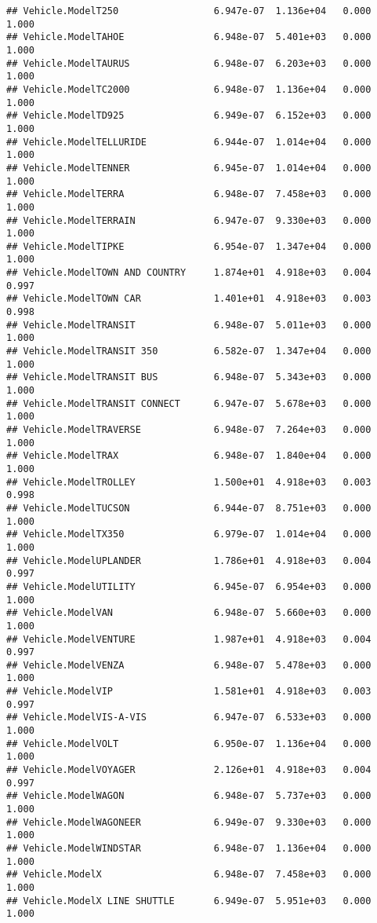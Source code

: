 \documentclass[
]{article}
\begin{document}
\begin{verbatim}
## Vehicle.ModelT250                 6.947e-07  1.136e+04   0.000    1.000
## Vehicle.ModelTAHOE                6.948e-07  5.401e+03   0.000    1.000
## Vehicle.ModelTAURUS               6.948e-07  6.203e+03   0.000    1.000
## Vehicle.ModelTC2000               6.948e-07  1.136e+04   0.000    1.000
## Vehicle.ModelTD925                6.949e-07  6.152e+03   0.000    1.000
## Vehicle.ModelTELLURIDE            6.944e-07  1.014e+04   0.000    1.000
## Vehicle.ModelTENNER               6.945e-07  1.014e+04   0.000    1.000
## Vehicle.ModelTERRA                6.948e-07  7.458e+03   0.000    1.000
## Vehicle.ModelTERRAIN              6.947e-07  9.330e+03   0.000    1.000
## Vehicle.ModelTIPKE                6.954e-07  1.347e+04   0.000    1.000
## Vehicle.ModelTOWN AND COUNTRY     1.874e+01  4.918e+03   0.004    0.997
## Vehicle.ModelTOWN CAR             1.401e+01  4.918e+03   0.003    0.998
## Vehicle.ModelTRANSIT              6.948e-07  5.011e+03   0.000    1.000
## Vehicle.ModelTRANSIT 350          6.582e-07  1.347e+04   0.000    1.000
## Vehicle.ModelTRANSIT BUS          6.948e-07  5.343e+03   0.000    1.000
## Vehicle.ModelTRANSIT CONNECT      6.947e-07  5.678e+03   0.000    1.000
## Vehicle.ModelTRAVERSE             6.948e-07  7.264e+03   0.000    1.000
## Vehicle.ModelTRAX                 6.948e-07  1.840e+04   0.000    1.000
## Vehicle.ModelTROLLEY              1.500e+01  4.918e+03   0.003    0.998
## Vehicle.ModelTUCSON               6.944e-07  8.751e+03   0.000    1.000
## Vehicle.ModelTX350                6.979e-07  1.014e+04   0.000    1.000
## Vehicle.ModelUPLANDER             1.786e+01  4.918e+03   0.004    0.997
## Vehicle.ModelUTILITY              6.945e-07  6.954e+03   0.000    1.000
## Vehicle.ModelVAN                  6.948e-07  5.660e+03   0.000    1.000
## Vehicle.ModelVENTURE              1.987e+01  4.918e+03   0.004    0.997
## Vehicle.ModelVENZA                6.948e-07  5.478e+03   0.000    1.000
## Vehicle.ModelVIP                  1.581e+01  4.918e+03   0.003    0.997
## Vehicle.ModelVIS-A-VIS            6.947e-07  6.533e+03   0.000    1.000
## Vehicle.ModelVOLT                 6.950e-07  1.136e+04   0.000    1.000
## Vehicle.ModelVOYAGER              2.126e+01  4.918e+03   0.004    0.997
## Vehicle.ModelWAGON                6.948e-07  5.737e+03   0.000    1.000
## Vehicle.ModelWAGONEER             6.949e-07  9.330e+03   0.000    1.000
## Vehicle.ModelWINDSTAR             6.948e-07  1.136e+04   0.000    1.000
## Vehicle.ModelX                    6.948e-07  7.458e+03   0.000    1.000
## Vehicle.ModelX LINE SHUTTLE       6.949e-07  5.951e+03   0.000    1.000

\end{verbatim}
\end{document}
